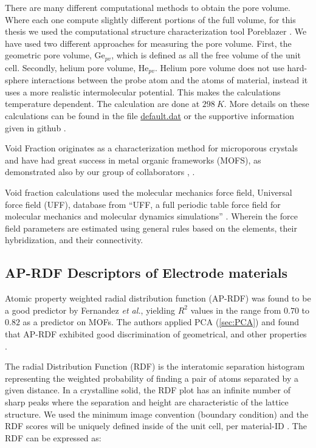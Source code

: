 	There are many different computational methods to obtain the pore volume. Where each one compute slightly different portions of the full volume, for this thesis we used the computational structure characterization tool Poreblazer \cite{ongari2017accurate}. We have used two different approaches for measuring the pore volume. First, the geometric pore volume, $\text{Ge}_{pv}$, which is defined as all the free volume of the unit cell. Secondly, helium pore volume, $\text{He}_{pv}$. Helium pore volume does not use hard-sphere interactions between the probe atom and the atoms of material, instead it uses a more realistic intermolecular potential. This makes the calculations temperature dependent. The calculation are done at $\SI{298}{K}$. More details on these calculations can be found in the file \href{https://github.com/sondrt/Machine-Learning-the-Voltage-Capacity-and-Energy-density-of-Electrode-Materials/blob/master/cif_for_poreblazer/defaults.dat}{default.dat} or the supportive information given in github \cite{github}.

	Void Fraction originates as a characterization method for microporous crystals and have had great success in metal organic frameworks (MOFS), as demonstrated also by our group of collaborators \cite{fanourgakis2019robust}, \cite{fanourgakis2020universal}.
	
Void fraction calculations used the molecular mechanics force field, Universal force field (\ac{UFF}), database from “UFF, a full periodic table force field for molecular mechanics and molecular dynamics simulations” \cite{rappe1992uff}. Wherein the force field parameters are estimated using general rules based on the elements, their hybridization, and their connectivity.
	
\subsection{AP-RDF Descriptors of Electrode materials}\label{sec:APRDF}

	Atomic property weighted radial distribution function (AP-RDF) was found to be a good predictor by Fernandez \textit{et al.}, yielding $R^2$ values in the range from $0.70$ to $0.82$ as a predictor on MOFs. The authors applied PCA (\ref{sec:PCA}) and found that AP-RDF exhibited good discrimination of geometrical, and other properties \cite{fernandez2013atomic}.

	The radial Distribution Function (\ac{RDF}) is the interatomic separation histogram representing the weighted probability of finding a pair of atoms separated by a given distance. In a crystalline solid, the RDF plot has an infinite number of sharp peaks where the separation and height are characteristic of the lattice structure. We used the minimum image convention (boundary condition) and the RDF scores will be uniquely defined inside of the unit cell, per material-ID \cite{frenkel2001understanding}. The RDF can be expressed as:
	
